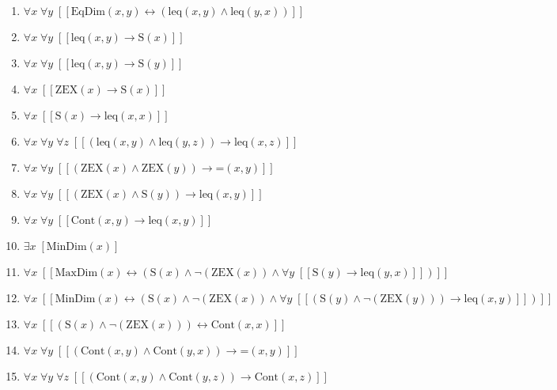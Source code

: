 \documentclass{article}
\begin{document}
\begin{enumerate}
\item $\forall x\; \forall y\;  \left[ \left[ \textrm{EqDim}(x,y) \leftrightarrow \left(\textrm{leq}(x,y) \land \textrm{leq}(y,x)\right) \right] \right]$
\item $\forall x\; \forall y\;  \left[ \left[ \textrm{leq}(x,y) \rightarrow \textrm{S}(x) \right] \right]$
\item $\forall x\; \forall y\;  \left[ \left[ \textrm{leq}(x,y) \rightarrow \textrm{S}(y) \right] \right]$
\item $\forall x\;  \left[ \left[ \textrm{ZEX}(x) \rightarrow \textrm{S}(x) \right] \right]$
\item $\forall x\;  \left[ \left[ \textrm{S}(x) \rightarrow \textrm{leq}(x,x) \right] \right]$
\item $\forall x\; \forall y\; \forall z\;  \left[ \left[ \left(\textrm{leq}(x,y) \land \textrm{leq}(y,z)\right) \rightarrow \textrm{leq}(x,z) \right] \right]$
\item $\forall x\; \forall y\;  \left[ \left[ \left(\textrm{ZEX}(x) \land \textrm{ZEX}(y)\right) \rightarrow \textrm{=}(x,y) \right] \right]$
\item $\forall x\; \forall y\;  \left[ \left[ \left(\textrm{ZEX}(x) \land \textrm{S}(y)\right) \rightarrow \textrm{leq}(x,y) \right] \right]$
\item $\forall x\; \forall y\;  \left[ \left[ \textrm{Cont}(x,y) \rightarrow \textrm{leq}(x,y) \right] \right]$
\item $\exists x\;  \left[ \textrm{MinDim}(x) \right]$
\item $\forall x\;  \left[ \left[ \textrm{MaxDim}(x) \leftrightarrow \left(\textrm{S}(x) \land \neg \left(\textrm{ZEX}(x)\right) \land \forall y\;  \left[ \left[ \textrm{S}(y) \rightarrow \textrm{leq}(y,x) \right] \right]\right) \right] \right]$
\item $\forall x\;  \left[ \left[ \textrm{MinDim}(x) \leftrightarrow \left(\textrm{S}(x) \land \neg \left(\textrm{ZEX}(x)\right) \land \forall y\;  \left[ \left[ \left(\textrm{S}(y) \land \neg \left(\textrm{ZEX}(y)\right)\right) \rightarrow \textrm{leq}(x,y) \right] \right]\right) \right] \right]$
\item $\forall x\;  \left[ \left[ \left(\textrm{S}(x) \land \neg \left(\textrm{ZEX}(x)\right)\right) \leftrightarrow \textrm{Cont}(x,x) \right] \right]$
\item $\forall x\; \forall y\;  \left[ \left[ \left(\textrm{Cont}(x,y) \land \textrm{Cont}(y,x)\right) \rightarrow \textrm{=}(x,y) \right] \right]$
\item $\forall x\; \forall y\; \forall z\;  \left[ \left[ \left(\textrm{Cont}(x,y) \land \textrm{Cont}(y,z)\right) \rightarrow \textrm{Cont}(x,z) \right] \right]$

\end{enumerate}
\end{document}
